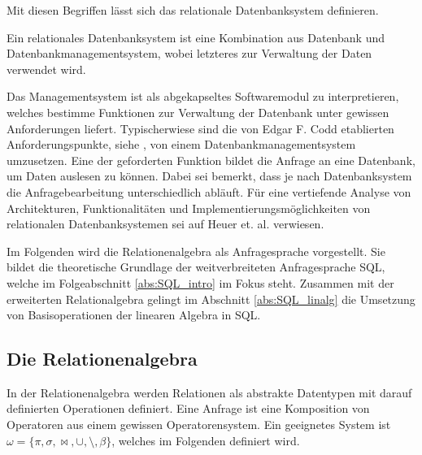 Mit diesen Begriffen lässt sich das relationale Datenbanksystem definieren.

\begin{defi}
    Ein relationales Datenbanksystem ist eine Kombination aus Datenbank und Datenbankmanagementsystem, wobei letzteres zur Verwaltung der Daten verwendet wird.
\end{defi}

Das Managementsystem ist als abgekapseltes Softwaremodul zu interpretieren, welches bestimme Funktionen zur Verwaltung der Datenbank unter gewissen Anforderungen liefert. Typischerwiese sind die von Edgar F. Codd etablierten Anforderungspunkte, siehe \cite{DBLP:books/daglib/0044627}, von einem Datenbankmanagementsystem umzusetzen. Eine der geforderten Funktion bildet die Anfrage an eine Datenbank, um Daten auslesen zu können. Dabei sei bemerkt, dass je nach Datenbanksystem die Anfragebearbeitung unterschiedlich abläuft. Für eine vertiefende Analyse von Architekturen, Funktionalitäten und Implementierungsmöglichkeiten von relationalen Datenbanksystemen sei auf Heuer et. al.\cite{DBLP:books/mitp/HSS19, DBLP:books/daglib/0044627} verwiesen. 

Im Folgenden wird die Relationenalgebra als Anfragesprache vorgestellt. Sie bildet die theoretische Grundlage der weitverbreiteten Anfragesprache SQL, welche im Folgeabschnitt \ref{abs:SQL_intro} im Fokus steht. Zusammen mit der erweiterten Relationalgebra gelingt im Abschnitt \ref{abs:SQL_linalg} die Umsetzung von Basisoperationen der linearen Algebra in SQL.

\subsection{Die Relationenalgebra}
\label{abs:rela_algebra}
In der Relationenalgebra werden Relationen als abstrakte Datentypen mit darauf definierten Operationen definiert. Eine Anfrage ist eine Komposition von Operatoren aus einem gewissen Operatorensystem. Ein geeignetes System ist $\omega= \{ \pi, \sigma, \bowtie, \cup, \setminus, \beta \}$, welches im Folgenden definiert wird.

